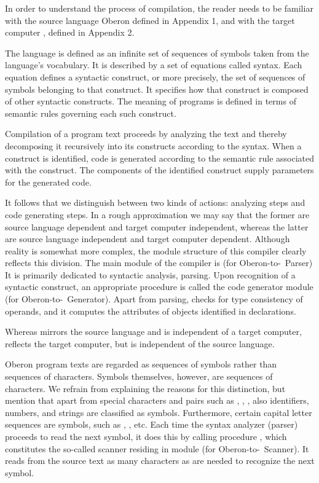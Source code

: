 In order to understand the process of compilation, the reader needs to be familiar with the source language Oberon defined in Appendix 1, and with the target computer \RISC, defined in Appendix 2.

The language is defined as an infinite set of sequences of symbols taken from the language's vocabulary. It is described by a set of equations called syntax. Each equation defines a syntactic construct, or more precisely, the set of sequences of symbols belonging to that construct. It specifies how that construct is composed of other syntactic constructs. The meaning of programs is defined in terms of semantic rules governing each such construct.

Compilation of a program text proceeds by analyzing the text and thereby decomposing it recursively into its constructs according to the syntax. When a construct is identified, code is generated according to the semantic rule associated with the construct. The components of the identified construct supply parameters for the generated code.

It follows that we distinguish between two kinds of actions: analyzing steps and code generating steps. In a rough approximation we may say that the former are source language dependent and target computer independent, whereas the latter are source language independent and target computer dependent. Although reality is somewhat more complex, the module structure of this compiler clearly reflects this division. The main module of the compiler is  (for Oberon-to-\RISC\ Parser) It is primarily dedicated to syntactic analysis, parsing. Upon recognition of a syntactic construct, an appropriate procedure is called the code generator module  (for Oberon-to-\RISC\ Generator). Apart from parsing,  checks for type consistency of operands, and it computes the attributes of objects identified in declarations.

Whereas  mirrors the source language and is independent of a target computer,  reflects the target computer, but is independent of the source language.

Oberon program texts are regarded as sequences of symbols rather than sequences of characters. Symbols themselves, however, are sequences of characters. We refrain from explaining the reasons for this distinction, but mention that apart from special characters and pairs such as \code{+}, \code{\&}, \code{<=}, also identifiers, numbers, and strings are classified as symbols. Furthermore, certain capital letter sequences are symbols, such as , , etc. Each time the syntax analyzer (parser) proceeds to read the next symbol, it does this by calling procedure , which constitutes the so-called scanner residing in module  (for Oberon-to-\RISC\ Scanner). It reads from the source text as many characters as are needed to recognize the next symbol.

